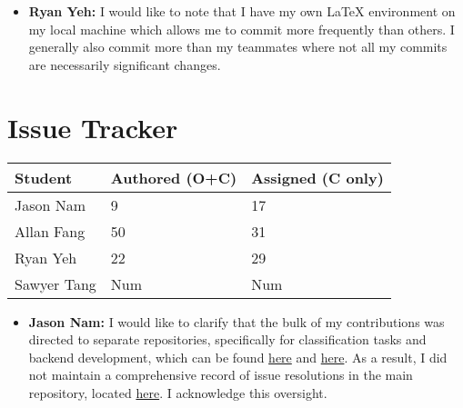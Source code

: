 \documentclass{article}
\begin{document}

\begin{itemize}
  \item \textbf{Ryan Yeh:} I would like to note that I have my own \LaTeX{} environment on my local machine
  which allows me to commit more frequently than others. I generally also commit more than my teammates where
  not all my commits are necessarily significant changes.
\end{itemize}


\section{Issue Tracker}


\begin{table}[H]
\centering
\begin{tabular}{lll}
\toprule
\textbf{Student} & \textbf{Authored (O+C)} & \textbf{Assigned (C only)}\\
\midrule
Jason Nam & 9 & 17 \\
Allan Fang & 50 & 31 \\
Ryan Yeh & 22 & 29 \\
Sawyer Tang & Num & Num \\
\bottomrule
\end{tabular}
\end{table}


\begin{itemize}
  \item \textbf{Jason Nam:} I would like to clarify that the bulk of my contributions was directed to separate repositories, specifically for classification tasks and backend development, which can be found \href{https://github.com/grocery-spending-tracker/grocery-spending-tracker-classification}{here} and \href{https://github.com/grocery-spending-tracker/grocery-spending-tracker-backend}{here}. As a result, I did not maintain a comprehensive record of issue resolutions in the main repository, located \href{https://github.com/r-yeh/grocery-spending-tracker}{here}. I acknowledge this oversight.
\end{itemize}
\end{document}
